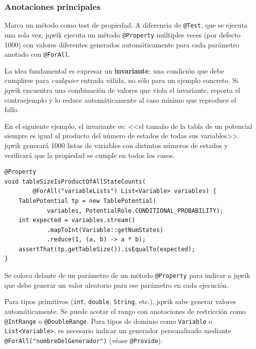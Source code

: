 \documentclass[12pt,a4paper]{article}
\begin{document}
\subsubsection{Anotaciones principales}

\begin{description}[leftmargin=2em, style=nextline]

  \item[\texttt{@Property}]
    Marca un método como test de propiedad. A diferencia de \texttt{@Test},
    que se ejecuta una sola vez, jqwik ejecuta un método \texttt{@Property}
    múltiples veces (por defecto 1000) con valores diferentes generados
    automáticamente para cada parámetro anotado con \texttt{@ForAll}.

    La idea fundamental es expresar un \textbf{invariante}: una condición
    que debe cumplirse para \emph{cualquier} entrada válida, no sólo para
    un ejemplo concreto. Si jqwik encuentra una combinación de valores que
    viola el invariante, reporta el contraejemplo y lo reduce automáticamente
    al caso mínimo que reproduce el fallo.

    En el siguiente ejemplo, el invariante es: <<el tamaño de la tabla de un
    potencial siempre es igual al producto del número de estados de todas sus
    variables>>. jqwik generará 1000 listas de variables con distintos números
    de estados y verificará que la propiedad se cumple en todos los casos.

\begin{lstlisting}[caption={\texttt{@Property}: invariante de tamaño de tabla}, label={lst:property}]
@Property
void tableSizeIsProductOfAllStateCounts(
        @ForAll("variableLists") List<Variable> variables) {
    TablePotential tp = new TablePotential(
            variables, PotentialRole.CONDITIONAL_PROBABILITY);
    int expected = variables.stream()
            .mapToInt(Variable::getNumStates)
            .reduce(1, (a, b) -> a * b);
    assertThat(tp.getTableSize()).isEqualTo(expected);
}
\end{lstlisting}

  \item[\texttt{@ForAll}]
    Se coloca delante de un parámetro de un método \texttt{@Property} para
    indicar a jqwik que debe generar un valor aleatorio para ese parámetro
    en cada ejecución.

    Para tipos primitivos (\texttt{int}, \texttt{double}, \texttt{String},
    etc.), jqwik sabe generar valores automáticamente. Se puede acotar el
    rango con anotaciones de restricción como \texttt{@IntRange} o
    \texttt{@DoubleRange}. Para tipos de dominio como \texttt{Variable} o
    \texttt{List<Variable>}, es necesario indicar un generador personalizado
    mediante \texttt{@ForAll("nombreDelGenerador")} (véase \texttt{@Provide}).


\end{description}
\end{document}
